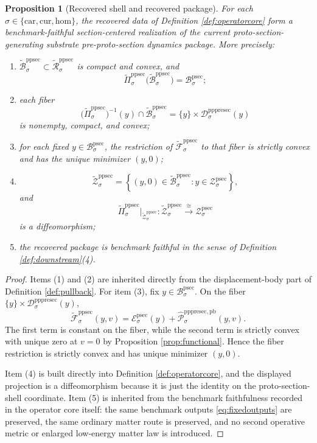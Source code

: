 \documentclass[11pt]{article}
\newcommand{\Car}{\mathrm{car}}
\newcommand{\Cur}{\mathrm{cur}}
\newcommand{\Hom}{\mathrm{hom}}
\newcommand{\ProtoSectionBody}[1]{\mathcal B_{#1}^{\mathrm{psec}}}
\newcommand{\ProtoSectionFunctional}[1]{\mathscr E_{#1}^{\mathrm{psec}}}
\newcommand{\ProtoSectionShell}[1]{\mathcal Z_{#1}^{\mathrm{psec}}}
\newcommand{\PrePreProtoSectionResidualBody}[1]{\mathcal D_{#1}^{\mathrm{pppresec}}}
\newcommand{\RecoveredPullbackFunctional}[1]{\widehat{\mathscr P}_{#1}^{\mathrm{pppresec,pb}}}
\newcommand{\OperatorCorePreProtoSectionState}[1]{\widetilde{\mathcal R}_{#1}^{\mathrm{ppsec}}}
\newcommand{\OperatorCorePreProtoSectionBody}[1]{\widetilde{\mathcal B}_{#1}^{\mathrm{ppsec}}}
\newcommand{\OperatorCorePreProtoSectionProj}[1]{\widetilde{\Pi}_{#1}^{\mathrm{ppsec}}}
\newcommand{\OperatorCorePreProtoSectionFunctional}[1]{\widetilde{\mathscr F}_{#1}^{\mathrm{ppsec}}}
\newcommand{\OperatorCorePreProtoSectionShell}[1]{\widetilde{\mathcal Z}_{#1}^{\mathrm{ppsec}}}
\newtheorem{proposition}{Proposition}
\begin{document}
\begin{proposition}[Recovered shell and recovered package]
\label{prop:package}
For each \(\sigma\in\{\Car,\Cur,\Hom\}\), the recovered data of Definition \ref{def:operatorcore} form a benchmark-faithful section-centered realization of the current proto-section-generating substrate pre-proto-section dynamics package. More precisely:
\begin{enumerate}
    \item \(\OperatorCorePreProtoSectionBody{\sigma}\subset\OperatorCorePreProtoSectionState{\sigma}\) is compact and convex, and
    \[
    \OperatorCorePreProtoSectionProj{\sigma}\bigl(\OperatorCorePreProtoSectionBody{\sigma}\bigr)
    =
    \ProtoSectionBody{\sigma};
    \]
    \item each fiber
    \[
    \bigl(\OperatorCorePreProtoSectionProj{\sigma}\bigr)^{-1}(y)
    \cap
    \OperatorCorePreProtoSectionBody{\sigma}
    =
    \{y\}\times\PrePreProtoSectionResidualBody{\sigma}(y)
    \]
    is nonempty, compact, and convex;
    \item for each fixed \(y\in\ProtoSectionBody{\sigma}\), the restriction of \(\OperatorCorePreProtoSectionFunctional{\sigma}\) to that fiber is strictly convex and has the unique minimizer \((y,0)\);
    \item
    \[
    \OperatorCorePreProtoSectionShell{\sigma}
    =
    \left\{
    (y,0)\in\OperatorCorePreProtoSectionBody{\sigma}:y\in\ProtoSectionShell{\sigma}
    \right\},
    \]
    and
    \[
    \OperatorCorePreProtoSectionProj{\sigma}\big|_{\OperatorCorePreProtoSectionShell{\sigma}}
    :
    \OperatorCorePreProtoSectionShell{\sigma}
    \xrightarrow{\cong}
    \ProtoSectionShell{\sigma}
    \]
    is a diffeomorphism;
    \item the recovered package is benchmark faithful in the sense of Definition \ref{def:downstream}(4).
\end{enumerate}
\end{proposition}

\begin{proof}
Items (1) and (2) are inherited directly from the displacement-body part of Definition \ref{def:pullback}. For item (3), fix \(y\in\ProtoSectionBody{\sigma}\). On the fiber \(\{y\}\times\PrePreProtoSectionResidualBody{\sigma}(y)\),
\[
\OperatorCorePreProtoSectionFunctional{\sigma}(y,v)
=
\ProtoSectionFunctional{\sigma}(y)
+
\RecoveredPullbackFunctional{\sigma}(y,v).
\]
The first term is constant on the fiber, while the second term is strictly convex with unique zero at \(v=0\) by Proposition \ref{prop:functional}. Hence the fiber restriction is strictly convex and has unique minimizer \((y,0)\).

Item (4) is built directly into Definition \ref{def:operatorcore}, and the displayed projection is a diffeomorphism because it is just the identity on the proto-section-shell coordinate. Item (5) is inherited from the benchmark faithfulness recorded in the operator core itself: the same benchmark outputs \eqref{eq:fixedoutputs} are preserved, the same ordinary matter route is preserved, and no second operative metric or enlarged low-energy matter law is introduced.
\end{proof}
\end{document}
